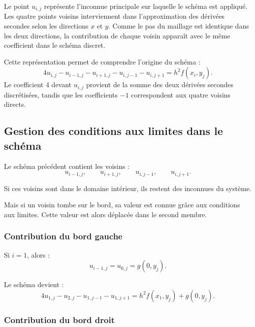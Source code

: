 \documentclass[12pt,a4paper]{article}
\begin{document}
	
	
	Le point $u_{i,j}$ représente l'inconnue principale sur laquelle le schéma est
	appliqué. Les quatre points voisins interviennent dans l'approximation des
	dérivées secondes selon les directions $x$ et $y$. Comme le pas du maillage est
	identique dans les deux directions, la contribution de chaque voisin apparaît
	avec le même coefficient dans le schéma discret.
	
	Cette représentation permet de comprendre l'origine du schéma :
	\[
	4u_{i,j}
	-
	u_{i-1,j}
	-
	u_{i+1,j}
	-
	u_{i,j-1}
	-
	u_{i,j+1}
	=
	h^2 f(x_i,y_j).
	\]
	Le coefficient $4$ devant $u_{i,j}$ provient de la somme des deux dérivées
	secondes discrétisées, tandis que les coefficients $-1$ correspondent aux quatre
	voisins directs.
	
	
	\subsection{Gestion des conditions aux limites dans le schéma}
	
	Le schéma précédent contient les voisins :
	\begin{equation*}
	u_{i-1,j},
	\qquad
	u_{i+1,j},
	\qquad
	u_{i,j-1},
	\qquad
	u_{i,j+1}.
	\end{equation*}
	
	Si ces voisins sont dans le domaine intérieur, ils restent des inconnues du système.
	
	Mais si un voisin tombe sur le bord, sa valeur est connue grâce aux conditions aux limites. Cette valeur est alors déplacée dans le second membre.
	
	\subsubsection*{Contribution du bord gauche}
	
	Si \(i=1\), alors :
	\begin{equation*}
	u_{i-1,j}=u_{0,j}=g(0,y_j).
	\end{equation*}
	
	Le schéma devient :
	\begin{equation*}
	4u_{1,j}
	-
	u_{2,j}
	-
	u_{1,j-1}
	-
	u_{1,j+1}
	=
	h^2 f(x_1,y_j)
	+
	g(0,y_j).
	\end{equation*}
	
	\subsubsection*{Contribution du bord droit}
	
\end{document}
